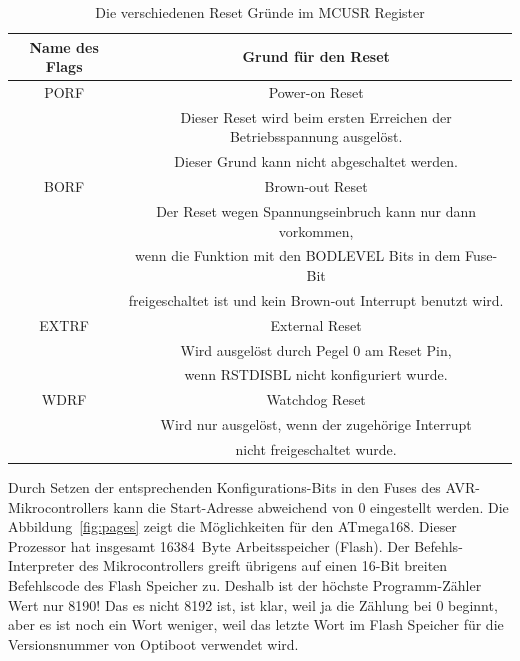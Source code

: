 \begin{table}[H]
  \begin{center}
    \begin{tabular}{| c | c |}
    \hline
              Name des Flags & Grund für den Reset \\
    \hline
    \hline
              PORF & Power-on Reset \\
                   & Dieser Reset wird beim ersten Erreichen der Betriebsspannung ausgelöst.\\
                   & Dieser Grund kann nicht abgeschaltet werden.\\
    \hline
              BORF & Brown-out Reset \\
                   & Der Reset wegen Spannungseinbruch kann nur dann vorkommen, \\
                   & wenn die Funktion mit den BODLEVEL Bits in dem Fuse-Bit \\
                   & freigeschaltet ist und kein Brown-out Interrupt benutzt wird.\\
    \hline
              EXTRF & External Reset \\
                    & Wird ausgelöst durch Pegel 0 am Reset Pin, \\
                    & wenn RSTDISBL nicht konfiguriert wurde. \\
    \hline
              WDRF & Watchdog Reset \\
		   & Wird nur ausgelöst, wenn der zugehörige Interrupt \\
		   & nicht freigeschaltet wurde. \\
    \hline
    \end{tabular}
  \end{center}
  \caption{Die verschiedenen Reset Gründe im MCUSR Register}
  \label{tab:resets}
\end{table}

Durch Setzen der entsprechenden Konfigurations-Bits in den Fuses des AVR-Mikrocontrollers
kann die Start-Adresse abweichend von 0 eingestellt werden.
Die Abbildung~\ref{fig:pages} zeigt die Möglichkeiten für den ATmega168.
Dieser Prozessor hat insgesamt 16384~Byte Arbeitsspeicher (Flash).
Der Befehls-Interpreter des Mikrocontrollers greift übrigens auf
einen 16-Bit breiten Befehlscode des Flash Speicher zu.
Deshalb ist der höchste Programm-Zähler Wert nur 8190!
Das es nicht 8192 ist, ist klar, weil ja die Zählung bei 0 beginnt,
aber es ist noch ein Wort weniger, weil das letzte Wort im Flash Speicher
für die Versionsnummer von Optiboot verwendet wird.

